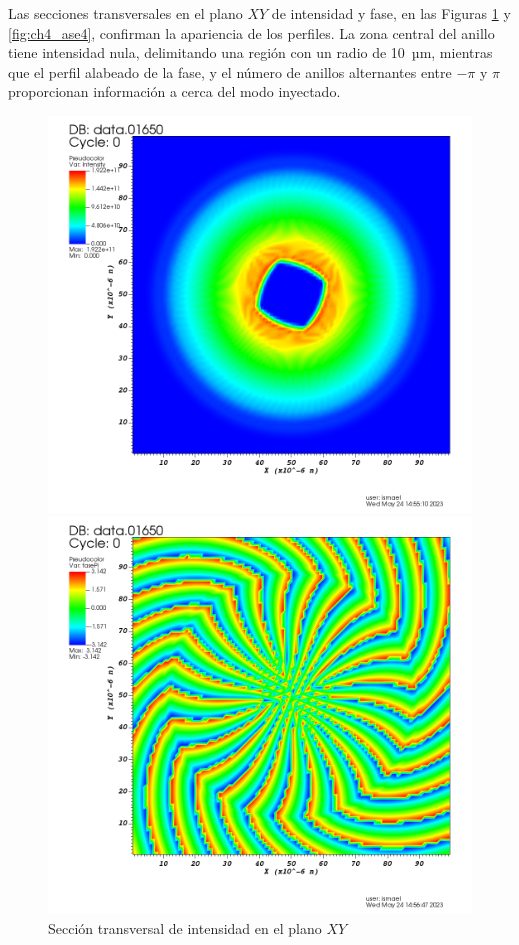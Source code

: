Las secciones transversales en el plano $XY$ de intensidad y fase, en las Figuras \ref{fig:ch4_ase3} y \ref{fig:ch4_ase4}, confirman la apariencia de los perfiles. La zona central del anillo tiene intensidad nula, delimitando una región con un radio de \qty{10}{µm}, mientras que el perfil alabeado de la fase, y el número de anillos alternantes entre $-\pi$ y $\pi$ proporcionan información a cerca del modo inyectado.

\begin{figure}[htbp]
  \centering
  \begin{subcaptionblock}{.4\textwidth}
    \centering
    \includegraphics[width=\textwidth]{Figuras/ch4_ase1.png}
    \caption{Sección transversal de intensidad en el plano $XY$}\label{fig:ch4_ase3}
  \end{subcaptionblock}
  \begin{subcaptionblock}{.4\textwidth}
    \centering
    \includegraphics[width=\textwidth]{Figuras/ch4_ase2.png}

\end{subcaptionblock}
\end{figure}

